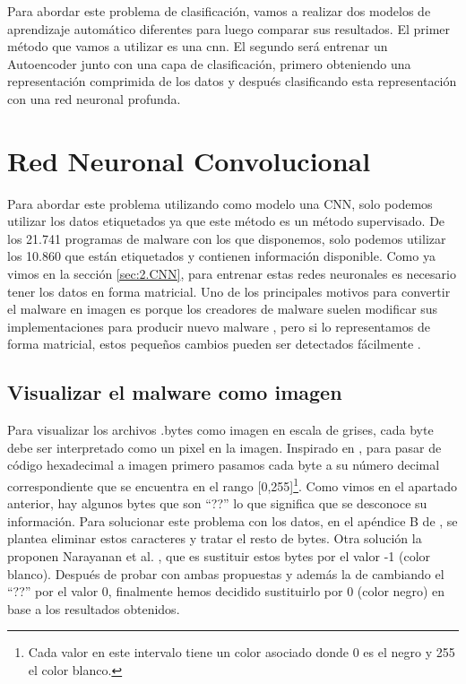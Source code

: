  


Para abordar este problema de clasificación, vamos a realizar dos modelos de aprendizaje automático diferentes para luego comparar sus resultados. El primer método que vamos a utilizar es una \acrfull{cnn}. El segundo será entrenar un Autoencoder junto con una capa de clasificación, primero obteniendo una representación comprimida de los datos y después clasificando esta representación con una red neuronal profunda. 
 







\section{Red Neuronal Convolucional}

Para abordar este problema utilizando como modelo una CNN, solo podemos utilizar los datos etiquetados ya que este método es un método supervisado. De los 21.741 programas de malware con los que disponemos, solo podemos utilizar los 10.860 que están etiquetados y contienen información disponible. Como ya vimos en la sección \ref{sec:2.CNN}, para entrenar estas redes neuronales es necesario tener los datos en forma matricial. Uno de los principales motivos para convertir el malware en imagen es porque los creadores de malware suelen modificar sus implementaciones para producir nuevo malware \citep{nataraj2015sattva}, pero si lo representamos de forma matricial, estos pequeños cambios pueden ser detectados fácilmente \citep{kalash2018malware}.

\subsection{Visualizar el malware como imagen}
Para visualizar los archivos .bytes como imagen en escala de grises, cada byte debe ser interpretado como un pixel en la imagen. Inspirado en \citep{nataraj2011malware}, para pasar de código hexadecimal a imagen primero pasamos cada byte a su número decimal correspondiente que se encuentra en el rango [0,255]\footnote{Cada valor en este intervalo tiene un color asociado donde 0 es el negro y 255 el color blanco.}. Como vimos en el apartado anterior, hay algunos bytes que son ``??'' lo que significa que se desconoce su información. Para solucionar este problema con los datos, en el apéndice B de \citep{geron2022hands}, se plantea eliminar estos caracteres y tratar el resto de bytes. Otra solución la proponen Narayanan et al. \citep{narayanan2016performance}, que es sustituir estos bytes por el valor -1 (color blanco). Después de probar con ambas propuestas y además la de cambiando el ``??'' por el valor 0, finalmente hemos decidido sustituirlo por 0 (color negro) en base a los resultados obtenidos. 

